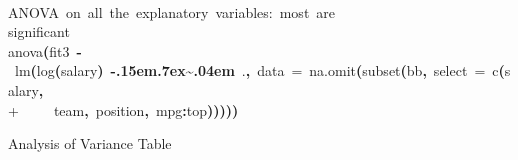\documentclass[english]{article}
\newenvironment{dummy}{\par}{\par}
\newcommand{\hlfunctioncall}[1]{\textcolor[rgb]{1,0,0}{#1}}%
\newcommand{\hlkeyword}[1]{\textcolor[rgb]{0,0,0}{\textbf{#1}}}%
\newcommand{\hlargument}[1]{\textcolor[rgb]{0.694117647058824,0.247058823529412,0.0196078431372549}{#1}}%
\newcommand{\hlcomment}[1]{\textcolor[rgb]{0.8,0.8,0.8}{#1}}%
\newcommand{\hlassignement}[1]{\textcolor[rgb]{0.215686274509804,0.215686274509804,0.384313725490196}{\textbf{#1}}}%
\newcommand{\hlsymbol}[1]{\textcolor[rgb]{0,0,0}{#1}}%
\newcommand{\hlprompt}[1]{\textcolor[rgb]{0,0,0}{#1}}%
\def\urltilda{\kern -.15em\lower .7ex\hbox{\~{}}\kern .04em}%
\newcommand{\hlstd}[1]{\textcolor[rgb]{0,0,0}{#1}}%
\begin{document}
\begin{dummy}
\hspace*{\fill}\\
\hlstd{}\ttfamily\noindent
\hlprompt{\usebox{\hlnormalsizeboxgreaterthan}{\ }}\hlcomment{\usebox{\hlnormalsizeboxhash}\usebox{\hlnormalsizeboxhash}{\ }ANOVA{\ }on{\ }all{\ }the{\ }explanatory{\ }variables:{\ }most{\ }are}\mbox{}
\normalfont
\hspace*{\fill}\\
\hlstd{}\ttfamily\noindent
\hlprompt{\usebox{\hlnormalsizeboxgreaterthan}{\ }}\hlcomment{\usebox{\hlnormalsizeboxhash}{\ }{\ }{\ }significant}\mbox{}
\normalfont
\hspace*{\fill}\\
\hlstd{}\ttfamily\noindent
\hlprompt{\usebox{\hlnormalsizeboxgreaterthan}{\ }}\hlfunctioncall{anova}\hlkeyword{(}\hlsymbol{fit3}{\ }\hlassignement{\usebox{\hlnormalsizeboxlessthan}-}{\ }\hlfunctioncall{lm}\hlkeyword{(}\hlfunctioncall{log}\hlkeyword{(}\hlsymbol{salary}\hlkeyword{)}{\ }\hlkeyword{\urltilda{}}{\ }\hlsymbol{.}\hlkeyword{,}{\ }\hlargument{data}{\ }\hlargument{=}{\ }\hlfunctioncall{na.omit}\hlkeyword{(}\hlfunctioncall{subset}\hlkeyword{(}\hlsymbol{bb}\hlkeyword{,}{\ }\hlargument{select}{\ }\hlargument{=}{\ }\hlfunctioncall{c}\hlkeyword{(}\hlsymbol{salary}\hlkeyword{,}\hspace*{\fill}\\
\hlstd{}\hlprompt{+{\ }}{\ }{\ }{\ }{\ }\hlsymbol{team}\hlkeyword{,}{\ }\hlsymbol{position}\hlkeyword{,}{\ }\hlsymbol{mpg}\hlkeyword{:}\hlsymbol{top}\hlkeyword{)}\hlkeyword{)}\hlkeyword{)}\hlkeyword{)}\hlkeyword{)}\mbox{}
\normalfont
\hspace*{\fill}\\
\hlstd{}\begin{Schunk}
\begin{Soutput}
Analysis of Variance Table


\end{Soutput}
\end{Schunk}
\end{dummy}
\end{document}
